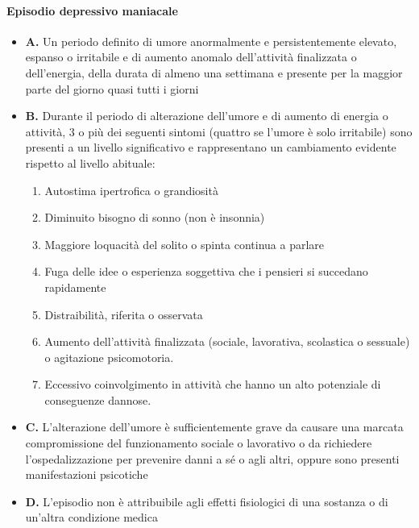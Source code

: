 \paragraph{Episodio depressivo maniacale}  
\begin{itemize}
	\item \textbf{A.} Un periodo definito di umore anormalmente e persistentemente elevato, espanso o irritabile e di aumento anomalo dell'attività finalizzata o dell'energia, della durata di almeno una settimana e presente per la maggior parte del giorno quasi tutti i giorni
	\item \textbf{B.} Durante il periodo di alterazione dell'umore e di aumento di energia o attività, 3 o più dei seguenti sintomi (quattro se l'umore è solo irritabile) sono presenti a un livello significativo e rappresentano un cambiamento evidente rispetto al livello abituale:
	\begin{enumerate}
		\item Autostima ipertrofica o grandiosità
		\item Diminuito bisogno di sonno (non è insonnia)
		\item Maggiore loquacità del solito o spinta continua a parlare
		\item Fuga delle idee o esperienza soggettiva che i pensieri si succedano rapidamente
		\item Distraibilità, riferita o osservata
		\item Aumento dell'attività finalizzata (sociale, lavorativa, scolastica o sessuale) o agitazione psicomotoria.
		\item Eccessivo coinvolgimento in attività che hanno un alto potenziale di conseguenze dannose.
	\end{enumerate}

	\item \textbf{C.} L'alterazione dell'umore è sufficientemente grave da causare una marcata compromissione del funzionamento sociale o lavorativo o da richiedere l'ospedalizzazione per prevenire danni a sé o agli altri, oppure sono presenti manifestazioni psicotiche
	\item \textbf{D.} L'episodio non è attribuibile agli effetti fisiologici di una sostanza o di un'altra condizione medica
\end{itemize}
